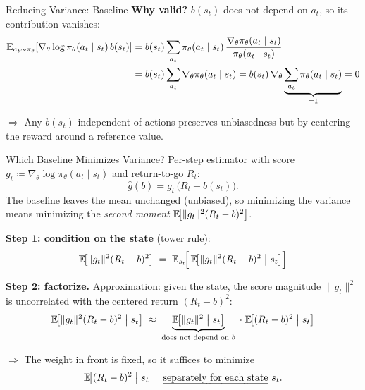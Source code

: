 \begin{frame}{Reducing Variance: Baseline}
  \vspace{-0.1em}
  \textbf{Why valid?} $b(s_t)$ does not depend on $a_t$, so its contribution vanishes:
  \begin{align*}
    \mathbb{E}_{a_t \sim \pi_\theta}\!\left[\nabla_\theta \log \pi_\theta(a_t \mid s_t) \, b(s_t)\right]
    &= b(s_t) \sum_{a_t} \pi_\theta(a_t \mid s_t) \, \frac{\nabla_\theta \pi_\theta(a_t \mid s_t)}{\pi_\theta(a_t \mid s_t)} \\
    &= b(s_t) \sum_{a_t} \nabla_\theta \pi_\theta(a_t \mid s_t)
    = b(s_t) \, \nabla_\theta \underbrace{\sum_{a_t} \pi_\theta(a_t \mid s_t)}_{= 1} = 0
  \end{align*}

  $\Rightarrow$ Any $b(s_t)$ independent of actions preserves unbiasedness but  by centering the reward around a reference value.
\end{frame}

\begin{frame}{Which Baseline Minimizes Variance?}
  Per-step estimator with score $g_t \coloneqq \nabla_\theta \log \pi_\theta(a_t \mid s_t)$ and return-to-go $R_t$:
  \[
    \hat{g}(b) = g_t\,\bigl(R_t - b(s_t)\bigr).
  \]
  The baseline leaves the mean unchanged (unbiased), so minimizing the variance means minimizing the \emph{second moment} $\mathbb{E}\!\bigl[\|g_t\|^2 (R_t - b)^2\bigr]$.

  \medskip
  \textbf{Step 1: condition on the state} (tower rule):
  \[
    \mathbb{E}\!\bigl[\|g_t\|^2 (R_t - b)^2\bigr]
      \;=\; \mathbb{E}_{s_t}\!\Bigl[\,\mathbb{E}\!\bigl[\|g_t\|^2 (R_t - b)^2 \bigm| s_t\bigr]\Bigr]
  \]

  \textbf{Step 2: factorize.} Approximation: given the state, the score magnitude $\|g_t\|^2$ is uncorrelated with the centered return $(R_t - b)^2$:
  \[
    \mathbb{E}\!\bigl[\|g_t\|^2 (R_t - b)^2 \bigm| s_t\bigr]
      \;\approx\; \underbrace{\mathbb{E}\!\bigl[\|g_t\|^2 \bigm| s_t\bigr]}_{\text{does not depend on } b}
      \;\cdot\; \mathbb{E}\!\bigl[(R_t - b)^2 \bigm| s_t\bigr]
  \]

  $\Rightarrow$ The weight in front is fixed, so it suffices to minimize
  \[
    \mathbb{E}\!\bigl[(R_t - b)^2 \bigm| s_t\bigr] \quad \text{\emph{separately for each state} } s_t.
  \]
\end{frame}

